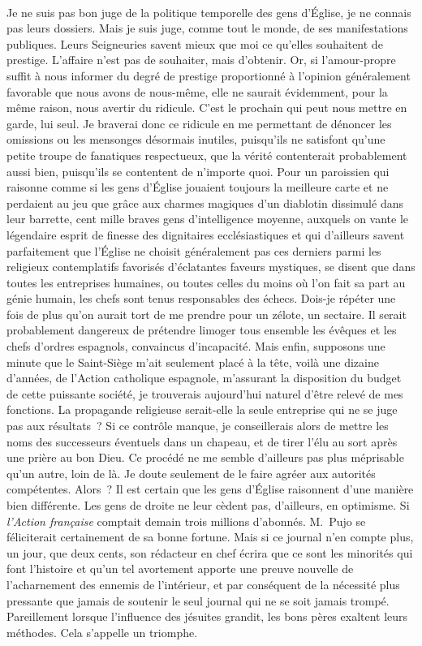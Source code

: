 \documentclass[french,twoside]{book} %
\newcommand{\astertri}{\medskip\par\centerline{\color{rubric}\large\selectfont{\syms ✻\,✻\,✻}}\medskip\par}%
\begin{document}
\astertri

\noindent  \par
Je ne suis pas bon juge de la politique temporelle des gens d’Église, je ne connais pas leurs dossiers. Mais je suis juge, comme tout le monde, de ses manifestations publiques. Leurs Seigneuries savent mieux que moi ce qu’elles souhaitent de prestige. L’affaire n’est pas de souhaiter, mais d’obtenir. Or, si l’amour-propre suffit à nous informer du degré de prestige proportionné à l’opinion généralement favorable que nous avons de nous-même, elle ne saurait évidemment, pour la même raison, nous avertir du ridicule. C’est le prochain qui peut nous mettre en garde, lui seul. Je braverai donc ce ridicule en me permettant de dénoncer les omissions ou les mensonges désormais inutiles, puisqu’ils ne satisfont qu’une petite troupe de fanatiques respectueux, que la vérité contenterait probablement aussi bien, puisqu’ils se contentent de n’importe quoi. Pour un paroissien qui raisonne comme si les gens d’Église jouaient toujours la meilleure carte et ne perdaient au jeu que grâce aux charmes magiques d’un diablotin dissimulé dans leur barrette, cent mille braves gens d’intelligence moyenne, auxquels on vante le légendaire esprit de finesse des dignitaires ecclésiastiques et qui d’ailleurs savent parfaitement que l’Église ne choisit généralement pas ces derniers parmi les religieux contemplatifs favorisés d’éclatantes faveurs mystiques, se disent que dans toutes les entreprises humaines, ou toutes celles du moins où l’on fait sa part au génie humain, les chefs sont tenus responsables des échecs. Dois-je répéter une fois de plus qu’on aurait tort de me prendre pour un zélote, un sectaire. Il serait probablement dangereux de prétendre limoger tous ensemble les évêques et les chefs d’ordres espagnols, convaincus d’incapacité. Mais enfin, supposons une minute que le Saint-Siège m’ait seulement placé à la tête, voilà une dizaine d’années, de l’Action catholique espagnole, m’assurant la disposition du budget de cette puissante société, je trouverais aujourd’hui naturel d’être relevé de mes fonctions. La propagande religieuse serait-elle la seule entreprise qui ne se juge pas aux résultats ? Si ce contrôle manque, je conseillerais alors de mettre les noms des successeurs éventuels dans un chapeau, et de tirer l’élu au sort après une prière au bon Dieu. Ce procédé ne me semble d’ailleurs pas plus méprisable qu’un autre, loin de là. Je doute seulement de le faire agréer aux autorités compétentes. Alors ? Il est certain que les gens d’Église raisonnent d’une manière bien différente. Les gens de droite ne leur cèdent pas, d’ailleurs, en optimisme. Si \emph{l’Action française} comptait demain trois millions d’abonnés. M. Pujo se féliciterait certainement de sa bonne fortune. Mais si ce journal n’en compte plus, un jour, que deux cents, son rédacteur en chef écrira que ce sont les minorités qui font l’histoire et qu’un tel avortement apporte une preuve nouvelle de l’acharnement des ennemis de l’intérieur, et par conséquent de la nécessité plus pressante que jamais de soutenir le seul journal qui ne se soit jamais trompé. Pareillement lorsque l’influence des jésuites grandit, les bons pères exaltent leurs méthodes. Cela s’appelle un triomphe. 
\end{document}
